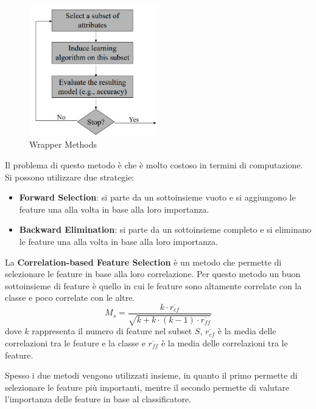\begin{itemize}
            \begin{figure}[!ht]
                  \centering
                  \includegraphics[width=0.5\textwidth]{./img/Preprocessing/wrapper.png}
                  \caption{Wrapper Methods}
                  \label{fig:wrapper}
            \end{figure}

            Il problema di questo metodo è che è molto costoso in termini di
            computazione. Si possono utilizzare due strategie:
            \begin{itemize}
                  \item \textbf{Forward Selection}: si parte da un sottoinsieme
                        vuoto e si aggiungono le feature una alla volta in base
                        alla loro importanza.
                  \item \textbf{Backward Elimination}: si parte da un sottoinsieme
                        completo e si eliminano le feature una alla volta in base
                        alla loro importanza.
            \end{itemize}
\end{itemize}

La \textbf{Correlation-based Feature Selection} è un metodo che permette di
selezionare le feature in base alla loro correlazione. Per questo metodo un
buon sottoinsieme di feature è quello in cui le feature sono altamente correlate
con la classe e poco correlate con le altre.
\begin{equation}
      M_s = \frac{k \cdot \overline{r_{cf}}}{\sqrt{k + k \cdot (k - 1) \cdot \overline{r_{ff}}}}
\end{equation}
dove $k$ rappresenta il numero di feature nel subset $S$, $\overline{r_{cf}}$ è la
media delle correlazioni tra le feature e la classe e $\overline{r_{ff}}$ è la media
delle correlazioni tra le feature.

Spesso i due metodi vengono utilizzati insieme, in quanto il primo permette di
selezionare le feature più importanti, mentre il secondo permette di valutare
l'importanza delle feature in base al classificatore.